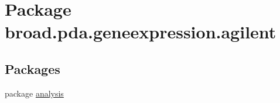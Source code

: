 \hypertarget{namespacebroad_1_1pda_1_1geneexpression_1_1agilent}{\section{Package broad.\+pda.\+geneexpression.\+agilent}
\label{namespacebroad_1_1pda_1_1geneexpression_1_1agilent}
}
\subsection*{Packages}
\begin{DoxyCompactItemize}
\item 
package \hyperlink{namespacebroad_1_1pda_1_1geneexpression_1_1agilent_1_1analysis}{analysis}
\end{DoxyCompactItemize}
